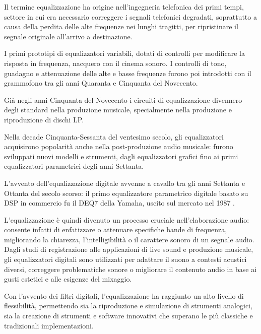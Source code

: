 \documentclass[12pt]{report}
\begin{document}
Il termine equalizzazione ha origine nell'ingegneria telefonica dei primi tempi, settore in cui era necessario correggere i segnali telefonici degradati, soprattutto a causa della perdita delle alte frequenze nei lunghi tragitti, per ripristinare il segnale originale all'arrivo a destinazione.

I primi prototipi di equalizzatori variabili, dotati di controlli per modificare la risposta in frequenza, nacquero con il cinema sonoro. I controlli di tono, guadagno e attenuazione delle alte e basse frequenze furono poi introdotti con il grammofono tra gli anni Quaranta e Cinquanta del Novecento.

Già negli anni Cinquanta del Novecento i circuiti di equalizzazione divennero degli standard nella produzione musicale, specialmente nella produzione e riproduzione di dischi LP.

Nella decade Cinquanta-Sessanta del ventesimo secolo, gli equalizzatori acquisirono popolarità anche nella post-produzione audio musicale: furono sviluppati nuovi modelli e strumenti, dagli equalizzatori grafici fino ai primi equalizzatori parametrici degli anni Settanta.

L'avvento dell'equalizzazione digitale avvenne a cavallo tra gli anni Settanta e Ottanta del secolo scorso: il primo equalizzatore parametrico digitale basato su DSP in commercio fu il DEQ7 della Yamaha, uscito sul mercato nel 1987 \parencite{reiss2016all}.

L'equalizzazione è quindi divenuto un processo cruciale nell'elaborazione audio: consente infatti di enfatizzare o attenuare specifiche bande di frequenza, migliorando la chiarezza, l'intelligibilità o il carattere sonoro di un segnale audio. Dagli studi di registrazione alle applicazioni di live sound e produzione musicale, gli equalizzatori digitali sono utilizzati per adattare il suono a contesti acustici diversi, correggere problematiche sonore o migliorare il contenuto audio in base ai gusti estetici e alle esigenze del mixaggio.

Con l’avvento dei filtri digitali, l’equalizzazione ha raggiunto un alto livello di flessibilità, permettendo sia la riproduzione e simulazione di strumenti analogici, sia la creazione di strumenti e software innovativi che superano le
più classiche e tradizionali implementazioni.
\end{document}
